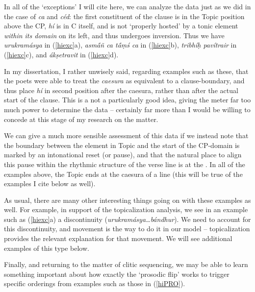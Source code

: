 \documentclass[output=paper,
modfonts
]{LSP/langsci}
\begin{document}
\noindent In all of the `exceptions' I will cite here, we can analyze the data just as we did in the case of
\textit{ca} and \textit{céd}: the first constituent of the clause is in the Topic position
above the CP, \textit{hí} is in C itself, and is not `properly hosted' by a tonic element \textit{within
its domain} on its left, and thus undergoes inversion. Thus we have {\ob} \textit{urukramásya}{\cb}
in (\ref{hiexc}a), {\ob} \textit{asmā́ñ ca tā́ṃś ca}{\cb} in (\ref{hiexc}b), {\ob} \textit{tribhíḥ pavítrair}{\cb}
in (\ref{hiexc}c), and {\ob} \textit{ákṣetravit}{\cb} in (\ref{hiexc}d).

In my dissertation, I rather unwisely said, regarding examples such as these, that the poets were able to
treat the \textit{caesura} as equivalent to a clause-boundary, and thus place \textit{hí} in second
position after the caesura, rather than after the actual start of the clause. This is a not a particularly good idea, giving
the meter far too much power to determine the data -- certainly far more than I would be willing to concede at this 
stage of  my research on the matter.

We can give a much more sensible assessment of this data if we instead note that the boundary between the element
in Topic and the start of the CP-domain is marked by an intonational reset (or pause), and that the natural
place to align this pause within the rhythmic structure of the verse line is at the . In all of the examples
above, the Topic ends at the caesura of a  line (this will be true of the examples I cite below
as well).

As usual, there are many other interesting things going on with these examples as well. For example, in support of the
topicalization analysis, we see in an example such as (\ref{hiexc}a) a discontinuity (\textit{urukramásya\ldots bándhur}).
We need to account for this discontinuity, and movement is the way to do it in our model -- topicalization provides
the relevant explanation for that movement. We will see additional
examples of this type below.

Finally, and returning to the matter of clitic sequencing, we may be able to learn something important about how exactly the `prosodic flip' works to trigger specific orderings from examples
such as those in (\ref{hiPRO}).

\end{document}
